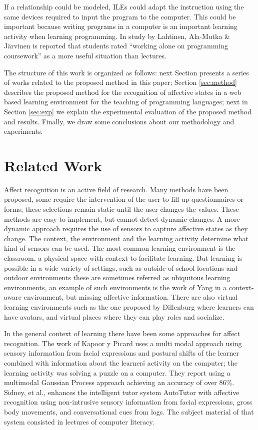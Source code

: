 \documentclass[a4paper,twoside]{article}
\begin{document}
If a relationship could be modeled, ILEs could adapt the instruction using the
same devices required to input the program to the computer. This could be
important because writing programs in a computer is an important learning
activity when learning programming. In study by Lahtinen, Ala-Mutka \& Järvinen
\cite{lahtinen2005study} is reported that students rated ``working alone on programming coursework'' as a more useful situation than lectures.

The structure of this work is organized as follows: next Section
presents a series of works related to the proposed method in this paper; Section
\ref{sec:method} describes the proposed method for the recognition of affective
states in a web based learning environment for the teaching of programming
languages; next in Section \ref{sec:exp} we explain the experimental evaluation of the
proposed method and results.
Finally, we draw some conclusions about our methodology and
experiments.


\section{Related Work}

Affect recognition is an active field of research. Many
methods have been proposed, some require the intervention of the user to fill up
questionnaires or forms; these selections remain static until the user changes
the values. These methods are easy to implement, but cannot detect dynamic
changes.  A more dynamic approach requires the use of sensors to capture
affective states as they change. The context, the environment and the learning
activity determine what kind of sensors can be used. The most common learning
environment is the classroom, a physical space with context to facilitate
learning. But learning is possible in a wide variety of settings, such as
outside-of-school locations and outdoor environments these are sometimes
referred as ubiquitous learning environments, an example of such environments is
the work of Yang \cite{yang2006context} in a context-aware environment, but missing affective
information. There are also virtual learning environments such as the one proposed by Dillenburg
\cite{dillenbourg2002virtual}  where learners can have avatars, and virtual places
where they can play roles and socialize.

In the general context of learning there have been some approaches for affect
recognition. The work of Kapoor y Picard \cite{kapoor2005multimodal} uses a multi modal
approach using sensory information from facial expressions and postural shifts
of the learner combined with information about the learner\'s activity on the
computer; the learning activity was solving a puzzle on a computer. They report
using a multimodal Gaussian Process approach achieving an accuracy of over 86\%.
Sidney, et al., \cite{sidney2005integrating} enhances the intelligent tutor system AutoTutor with
affective recognition using non-intrusive sensory information from facial
expressions, gross body movements, and conversational cues from logs.  The
subject material of that system consisted in lectures of computer
literacy.
\end{document}

